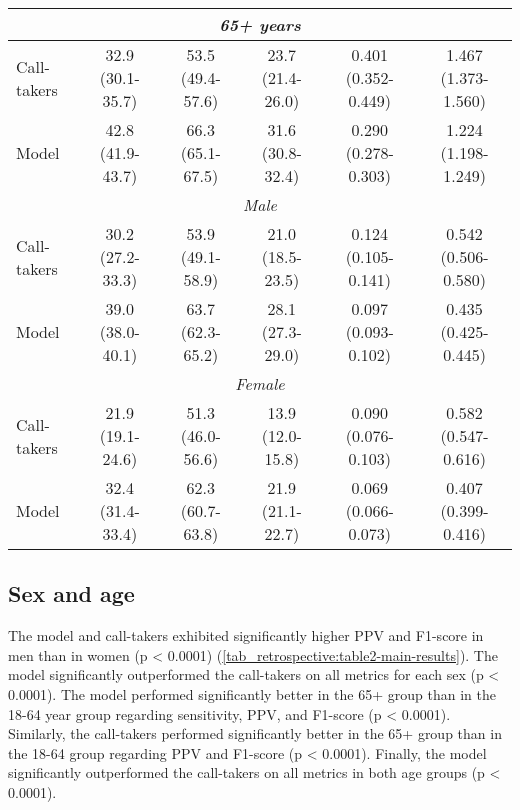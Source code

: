 {\begin{table}[t]
{\begin{tabular}{l|ccccc}
        \midrule
        \multicolumn{6}{c}{\emph{65+ years}} \\
        \midrule
        Call-takers                                 & 32.9 (30.1-35.7) & 53.5 (49.4-57.6) & 23.7 (21.4-26.0) & 0.401 (0.352-0.449) & 1.467 (1.373-1.560) \\
        Model                                       & 42.8 (41.9-43.7) & 66.3 (65.1-67.5) & 31.6 (30.8-32.4) & 0.290 (0.278-0.303) & 1.224 (1.198-1.249) \\

        \midrule
        \multicolumn{6}{c}{\emph{Male}} \\
        \midrule
        Call-takers                                 & 30.2 (27.2-33.3) & 53.9 (49.1-58.9) & 21.0 (18.5-23.5) & 0.124 (0.105-0.141) & 0.542 (0.506-0.580) \\
        Model                                       & 39.0 (38.0-40.1) & 63.7 (62.3-65.2) & 28.1 (27.3-29.0) & 0.097 (0.093-0.102) & 0.435 (0.425-0.445) \\

        \midrule
        \multicolumn{6}{c}{\emph{Female}} \\
        \midrule
        Call-takers                                 & 21.9 (19.1-24.6) & 51.3 (46.0-56.6) & 13.9 (12.0-15.8) & 0.090 (0.076-0.103) & 0.582 (0.547-0.616) \\
        Model                                       & 32.4 (31.4-33.4) & 62.3 (60.7-63.8) & 21.9 (21.1-22.7) & 0.069 (0.066-0.073) & 0.407 (0.399-0.416) \\
        
        \bottomrule
    \end{tabular}%
    }
\end{table}


\subsection{Sex and age}

The model and call-takers exhibited significantly higher PPV and F1-score in men than in women (p < 0.0001) (\cref{tab_retrospective:table2-main-results}). The model significantly outperformed the call-takers on all metrics for each sex (p < 0.0001).
The model performed significantly better in the 65+ group than in the 18-64 year group regarding sensitivity, PPV, and F1-score (p < 0.0001). Similarly, the call-takers performed significantly better in the 65+ group than in the 18-64 group regarding PPV and F1-score (p < 0.0001). Finally, the model significantly outperformed the call-takers on all metrics in both age groups (p < 0.0001).

}
